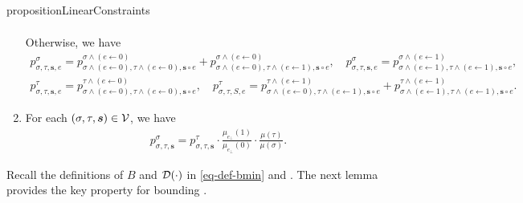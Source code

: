 \documentclass[11pt]{article}
\newcommand{\seqS}{\boldsymbol{s}}
\newcommand{\hktodo}[1]{{\color{blue}{#1}}}
\begin{document}
\begin{restatable}{proposition}{LinearConstraints}
\begin{enumerate}[(1)]
\begin{align}
            \end{align}
            Otherwise, we have
            \begin{align}\label{eqn-inner-child-sum3}
                p^{\sigma}_{\sigma,\tau, \seqS,e}=p^{\sigma \land (e\gets 0)}_{\sigma\land (e\gets 0),\tau\land (e\gets 0), \seqS\circ e}+p^{\sigma\land (e\gets 0)}_{\sigma\land (e\gets 0),\tau\land (e\gets 1), \seqS \circ e}, \quad  p^{\sigma}_{\sigma,\tau, \seqS,e}=p^{\sigma\land (e\gets 1)}_{\sigma\land (e\gets 1),\tau\land (e\gets 1), \seqS\circ e},
            \end{align}
            \begin{align}\label{eqn-inner-child-sum4}
                p^{\tau}_{\sigma,\tau, \seqS,e}=p^{\tau\land (e\gets 0)}_{\sigma\land (e\gets 0),\tau\land (e\gets 0), \seqS\circ e}, \quad  p^{\tau}_{\sigma,\tau,S,e}=p^{\tau\land (e\gets 1)}_{\sigma\land (e\gets 0),\tau\land (e\gets 1), \seqS \circ e} + p^{\tau \land (e\gets 1)}_{\sigma\land (e\gets 1),\tau\land (e\gets 1), \seqS\circ e}.
            \end{align}
            \item For each $(\sigma, \tau, \seqS) \in \+V$, we have
            \begin{align}\label{eqn-ratio}
            	{p^{\sigma}_{\sigma,\tau, \seqS}} = p^{\tau}_{\sigma,\tau, \seqS} \cdot \frac{\mu_{e_{\bot}}(1)}{\mu_{e_{\bot}}(0)}\cdot \frac{ \mu(\tau)}{ \mu(\sigma)}.
            \end{align}
        \end{enumerate}
    \end{restatable}
    
    Recall the definitions of $B$ and $\mathcal{D}(\cdot)$ in \eqref{eq-def-bmin} and . The next lemma provides the key property for bounding \hktodo{the coupling error}.
\end{document}
